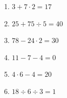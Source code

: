 %
%
    \begin{enumerate}
        \item \(3 + 7 \cdot 2 = 17\)
        \item \(25 + 75 \div 5 = 40\)
        \item \(78 - 24 \cdot 2 = 30\)
        \item \(11 - 7 - 4 = 0\)
        \item \(4 \cdot 6 - 4 = 20\)
        \item \(18 \div 6 \div 3 = 1\)
    \end{enumerate}
